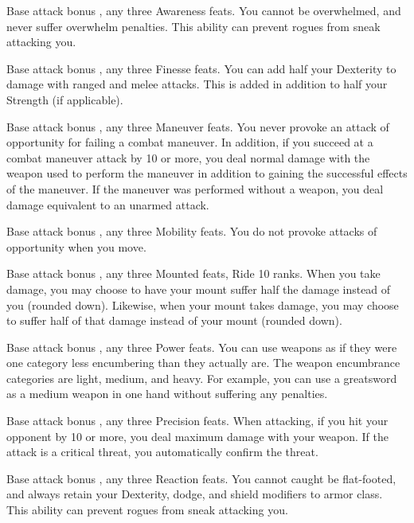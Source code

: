 \featpre Base attack bonus , any three Awareness feats.
\featben You cannot be overwhelmed, and never suffer overwhelm penalties. This ability can prevent rogues from sneak attacking you.

\featpre Base attack bonus , any three Finesse feats.
\featben You can add half your Dexterity to damage with ranged and melee attacks. This is added in addition to half your Strength (if applicable).

\featpre Base attack bonus , any three Maneuver feats.
\featben You never provoke an attack of opportunity for failing a combat maneuver. In addition, if you succeed at a combat maneuver attack by 10 or more, you deal normal damage with the weapon used to perform the maneuver in addition to gaining the successful effects of the maneuver. If the maneuver was performed without a weapon, you deal damage equivalent to an unarmed attack.

\featpre Base attack bonus , any three Mobility feats.
\featben You do not provoke attacks of opportunity when you move.

\featpre Base attack bonus , any three Mounted feats, Ride 10 ranks.
\featben When you take damage, you may choose to have your mount suffer half the damage instead of you (rounded down). Likewise, when your mount takes damage, you may choose to suffer half of that damage instead of your mount (rounded down).

\featpres Base attack bonus , any three Power feats.
\featben You can use weapons as if they were one category less encumbering than they actually are. The weapon encumbrance categories are light, medium, and heavy. For example, you can use a greatsword as a medium weapon in one hand without suffering any penalties.

\featpre Base attack bonus , any three Precision feats.
\featben When attacking, if you hit your opponent by 10 or more, you deal maximum damage with your weapon. If the attack is a critical threat, you automatically confirm the threat.

\featpre Base attack bonus , any three Reaction feats.
\featben You cannot caught be flat-footed, and always retain your Dexterity, dodge, and shield modifiers to armor class. This ability can prevent rogues from sneak attacking you.

